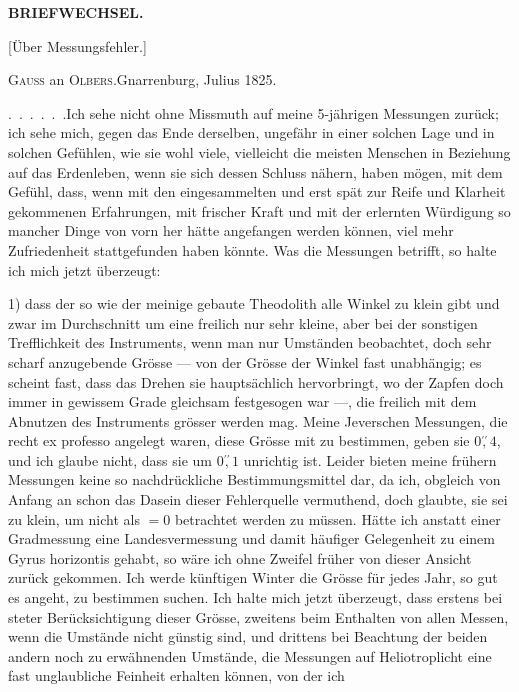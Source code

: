 \par\clearpage
\noindent{}\hfill{\small\textbf{BRIEFWECHSEL.}}\hfill\null\par\bigskip
\begin{center}{\large [Über Messungsfehler.]}\par\bigskip
{\large\textsc{Gauss} an \textsc{Olbers}.\quad Gnarrenburg, Julius 1825.}\end{center}
\par\noindent\hspace*{\parindent}.\ .\ .\ .\ .\ .\enspace Ich sehe nicht ohne Missmuth auf meine 5-jährigen Messungen zurück; ich sehe mich, gegen das Ende derselben, ungefähr in einer solchen Lage und in solchen Gefühlen, wie sie wohl viele, vielleicht die meisten Menschen in Beziehung auf das Erdenleben, wenn sie sich dessen Schluss nähern, haben mögen, mit dem Gefühl, dass, wenn mit den eingesammelten und erst spät zur Reife und Klarheit gekommenen Erfahrungen, mit frischer Kraft und mit der erlernten Würdigung so mancher Dinge von vorn her hätte angefangen werden können, viel mehr Zufriedenheit stattgefunden haben könnte. Was die Messungen betrifft, so halte ich mich jetzt überzeugt:

\par\noindent\hspace*{\parindent}1) dass der so wie der meinige gebaute Theodolith alle Winkel zu klein gibt und zwar im Durchschnitt um eine freilich nur sehr kleine, aber bei der sonstigen Trefflichkeit des Instruments, wenn man nur  Umständen beobachtet, doch sehr scharf anzugebende Grösse --- von der Grösse der Winkel fast unabhängig; es scheint fast, dass das  Drehen sie hauptsächlich hervorbringt, wo der Zapfen doch immer in gewissem Grade gleichsam festgesogen war ---, die freilich mit dem Abnutzen des Instruments grösser werden mag. Meine Jeverschen Messungen, die recht ex professo angelegt waren, diese Grösse mit zu bestimmen, geben sie $0\overset{\prime\prime}{,}4$, und ich glaube nicht, dass sie um $0\overset{\prime\prime}{,}1$ unrichtig ist. Leider bieten meine frühern Messungen keine so nachdrückliche Bestimmungsmittel dar, da ich, obgleich von Anfang an schon das Dasein dieser Fehlerquelle vermuthend, doch glaubte, sie sei zu klein, um nicht als $=0$ betrachtet werden zu müssen. Hätte ich anstatt einer Gradmessung eine Landesvermessung und damit häufiger Gelegenheit zu einem Gyrus horizontis gehabt, so wäre ich ohne Zweifel früher von dieser Ansicht zurück gekommen. Ich werde künftigen Winter die Grösse für jedes Jahr, so gut es angeht, zu bestimmen suchen. Ich halte mich jetzt überzeugt, dass erstens bei steter Berücksichtigung dieser Grösse, zweitens beim Enthalten von allen Messen, wenn die Umstände nicht günstig sind, und drittens bei Beachtung der beiden andern noch zu erwähnenden Umstände, die Messungen auf Heliotroplicht eine fast unglaubliche Feinheit erhalten können, von der ich

